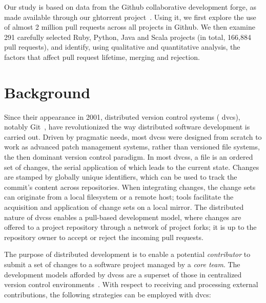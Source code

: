 \documentclass{sig-alternate}
\begin{document}
Our study is based on data from the Github collaborative development forge, as
made available through our {\sc ght}orrent project~\cite{G13}. Using it, we
first explore the use of almost 2 million pull requests across all projects in
Github. We then examine 291 carefully selected Ruby, Python, Java and Scala
projects (in total, 166,884 pull requests), and identify, using  qualitative and
quantitative analysis, the factors that affect pull request lifetime, merging
and rejection. 


\section{Background} \label{sec:bg}

Since their appearance in 2001, distributed version control systems ({\sc
dvcs}), notably Git~\cite{Chaco09}, have revolutionized the way distributed
software development is carried out. Driven by pragmatic needs, most {\sc dvcs}s
were designed from scratch to work as advanced patch management systems, rather
than versioned file systems, the then dominant version control paradigm. In most
{\sc dvcs}s, a file is an ordered set of changes, the serial application of
which leads to the current state. Changes are stamped by globally unique
identifiers, which can be used to track the commit's content across
repositories. When integrating changes, the change sets can originate from a
local filesystem or a remote host; tools facilitate the acquisition and
application of change sets on a local mirror. The distributed nature of {\sc
dvcs}s enables a pull-based development model, where changes are offered to a
project repository through a network of project forks; it is up to the
repository owner to accept or reject the incoming pull requests.

The purpose of distributed development is to enable a potential
\emph{contributor} to submit a set of changes to a software project managed by a
\emph{core team}. The development models afforded by {\sc dvcs}s are a superset
of those in centralized version control environments~\cite{Shiha12,Bird09}.
With respect to receiving and processing external contributions, the following
strategies can be employed with {\sc dvc}s:
\end{document}
